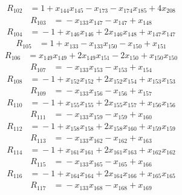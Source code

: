 \begin{align*}
R_{102}&={}1 +x_{144}x_{145} -x_{173} -x_{174}x_{185} +4x_{208}
\end{align*}
\begin{align*}
R_{103}&={}-x_{133}x_{147} -x_{147} +x_{148}
\end{align*}
\begin{align*}
R_{104}&={}-1 +x_{146}x_{146} +2x_{146}x_{148} +x_{147}x_{147}
\end{align*}
\begin{align*}
R_{105}&={}1 +x_{133} -x_{133}x_{150} -x_{150} +x_{151}
\end{align*}
\begin{align*}
R_{106}&={}x_{149}x_{149} +2x_{149}x_{151} -2x_{150} +x_{150}x_{150}
\end{align*}
\begin{align*}
R_{107}&={}-x_{133}x_{153} -x_{153} +x_{154}
\end{align*}
\begin{align*}
R_{108}&={}-1 +x_{152}x_{152} +2x_{152}x_{154} +x_{153}x_{153}
\end{align*}
\begin{align*}
R_{109}&={}-x_{133}x_{156} -x_{156} +x_{157}
\end{align*}
\begin{align*}
R_{110}&={}-1 +x_{155}x_{155} +2x_{155}x_{157} +x_{156}x_{156}
\end{align*}
\begin{align*}
R_{111}&={}-x_{133}x_{159} -x_{159} +x_{160}
\end{align*}
\begin{align*}
R_{112}&={}-1 +x_{158}x_{158} +2x_{158}x_{160} +x_{159}x_{159}
\end{align*}
\begin{align*}
R_{113}&={}-x_{133}x_{162} -x_{162} +x_{163}
\end{align*}
\begin{align*}
R_{114}&={}-1 +x_{161}x_{161} +2x_{161}x_{163} +x_{162}x_{162}
\end{align*}
\begin{align*}
R_{115}&={}-x_{133}x_{165} -x_{165} +x_{166}
\end{align*}
\begin{align*}
R_{116}&={}-1 +x_{164}x_{164} +2x_{164}x_{166} +x_{165}x_{165}
\end{align*}
\begin{align*}
R_{117}&={}-x_{133}x_{168} -x_{168} +x_{169}
\end{align*}
